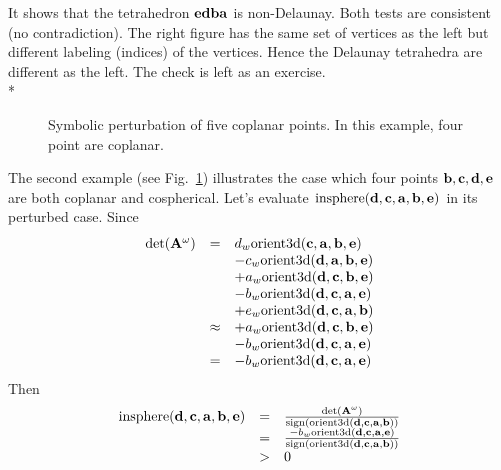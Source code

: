 It shows that the tetrahedron ${\bf edba}$ is non-Delaunay. Both tests are consistent (no contradiction).  The right figure has the same set of vertices as the left but different labeling (indices) of the vertices. Hence the Delaunay tetrahedra are different as the left. The check is left as an exercise.\\*

\begin{figure}
\caption{Symbolic perturbation of five coplanar points. In this example, four point are coplanar.}
\label{fig:ex2}
\end{figure}

The second example (see Fig.~\ref{fig:ex2}) illustrates the case which four points ${\bf b}, {\bf c}, {\bf d}, {\bf e}$ are both coplanar and cospherical. Let's evaluate $\textrm{insphere}({\bf d},{\bf c},{\bf a},{\bf b},{\bf e})$ in its perturbed case. Since
\[
\begin{array}{rcl}
\textrm{det}({\bf A}^{\omega}) &=&
d_w\textrm{orient3d}({\bf c},{\bf a},{\bf b},{\bf e})\\
& & -c_w\textrm{orient3d}({\bf d},{\bf a},{\bf b},{\bf e})\\
& & +a_w\textrm{orient3d}({\bf d},{\bf c},{\bf b},{\bf e})\\
& & -b_w\textrm{orient3d}({\bf d},{\bf c},{\bf a},{\bf e})\\
& & +e_w\textrm{orient3d}({\bf d},{\bf c},{\bf a},{\bf b})\\
&\approx& +a_w\textrm{orient3d}({\bf d},{\bf c},{\bf b},{\bf e})\\
& & -b_w\textrm{orient3d}({\bf d},{\bf c},{\bf a},{\bf e})\\
&=& -b_w\textrm{orient3d}({\bf d},{\bf c},{\bf a},{\bf e})
\end{array}
\]
Then
\[
\begin{array}{rcl}
\textrm{insphere}({\bf d},{\bf c},{\bf a},{\bf b},{\bf e}) &=&
\frac{\textrm{det}({\bf A}^{\omega})}{\textrm{sign}\left(\textrm{orient3d}({\bf d},{\bf c},{\bf a},{\bf b})\right)}\\
&=& \frac{-b_w\textrm{orient3d}({\bf d},{\bf c},{\bf a},{\bf e})}{\textrm{sign}\left(\textrm{orient3d}({\bf d},{\bf c},{\bf a},{\bf b})\right)}\\
&>& 0
\end{array}
\]


